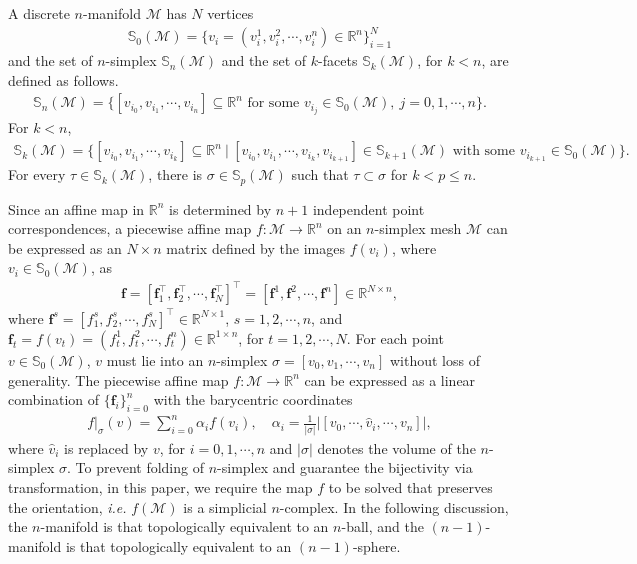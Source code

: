 \documentclass{article}
\begin{document}
A discrete $n$-manifold $\mathcal{M}$ has $N$ vertices
\begin{align*}
    \mathbb{S}_0(\mathcal{M}) = \{v_i = (v_i^1,v_i^2,\cdots,v_i^n) \in \mathbb{R}^n\}_{i=1}^N
\end{align*}
and the set of $n$-simplex $\mathbb{S}_n(\mathcal{M})$ and the set of $k$-facets $\mathbb{S}_k(\mathcal{M})$, for $k<n$, are defined as follows.
\begin{align}
    \mathbb{S}_n(\mathcal{M}) = \big\{[v_{i_0},v_{i_1},\cdots,v_{i_n}] \subseteq \mathbb{R}^n \text{ for some } v_{i_j} \in \mathbb{S}_0(\mathcal{M}), ~j = 0,1,\cdots,n\big\}.
\end{align}
For $k<n$,
\begin{align}
    \mathbb{S}_k(\mathcal{M}) = \big\{ [v_{i_0},v_{i_1},\cdots,v_{i_k}] \subseteq \mathbb{R}^n ~|~ [v_{i_0},v_{i_1},\cdots,v_{i_k},v_{i_{k+1}}] \in \mathbb{S}_{k+1}(\mathcal{M})
    \text{ with some } v_{i_{k+1}} \in \mathbb{S}_0(\mathcal{M}) \big\}.
\end{align}
For every $\tau \in \mathbb{S}_k(\mathcal{M})$, there is $\sigma \in \mathbb{S}_{p}(\mathcal{M})$ such that $\tau \subset \sigma$ for $k<p \leq n$.

Since an affine map in $\mathbb{R}^n$ is determined by $n+1$ independent point correspondences, a piecewise affine map $f:\mathcal{M}\to \mathbb{R}^n$ on an $n$-simplex mesh $\mathcal{M}$ can be expressed as an $N\times n$ matrix defined by the images $f(v_i)$, where $v_i \in \mathbb{S}_0(\mathcal{M})$, as
\begin{align}
    \mathbf{f} = [\mathbf{f}_1^\top, \mathbf{f}_2^\top, \cdots, \mathbf{f}_N^\top]^\top
    = [\mathbf{f}^1, \mathbf{f}^2, \cdots, \mathbf{f}^n] \in \mathbb{R}^{N\times n},
\end{align}
where $\mathbf{f}^s = [f_1^s,f_2^s,\cdots,f_N^s]^\top \in \mathbb{R}^{N\times 1}$, $s = 1,2,\cdots,n$, and $\mathbf{f}_{t} = f(v_t) = (f^1_t,f^2_t,\cdots,f^n_t) \in \mathbb{R}^{1\times n}$, for $t = 1,2,\cdots,N$. For each point $v\in \mathbb{S}_0(\mathcal{M})$, $v$ must lie into an $n$-simplex $\sigma = [v_0,v_1,\cdots,v_n]$ without loss of generality. The piecewise affine map $f:\mathcal{M} \to \mathbb{R}^n$ can be expressed as a linear combination of $\{\mathbf{f}_i\}_{i=0}^n$ with the barycentric coordinates
\begin{align} \label{eq:bary}
    f\big|_\sigma (v) = \sum_{i=0}^n \alpha_i f(v_i), \quad
    \alpha_i = \frac{1}{|\sigma|} \big| [v_0,\cdots,\hat{v}_i,\cdots,v_n] \big|,
\end{align}
where $\hat{v}_i$ is replaced by $v$, for $i = 0,1,\cdots,n$ and $|\sigma|$ denotes the volume of the $n$-simplex $\sigma$. To prevent folding of $n$-simplex and guarantee the bijectivity via transformation, in this paper, we require the map $f$ to be solved that preserves the orientation, \emph{i.e.} $f(\mathcal{M})$ is a simplicial $n$-complex. In the following discussion, the $n$-manifold is that topologically equivalent to an $n$-ball, and the $(n-1)$-manifold is that topologically equivalent to an $(n-1)$-sphere.
\end{document}
